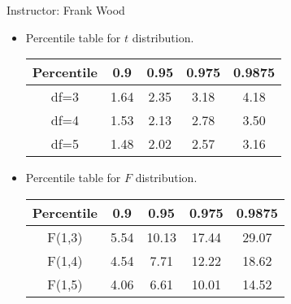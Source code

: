 \documentclass[12pt]{article}
\begin{document}

 \begin{center}
  Instructor: Frank Wood 
 \end{center}
\studentinfo
{}
\finishfirstpage

\begin{itemize}
  \item Percentile table for $t$ distribution.
\begin{center}

\begin{tabular}{c|cccc}
  \toprule
Percentile&0.9&0.95&0.975&0.9875\\
\midrule
df=3 & 1.64 & 2.35 & 3.18 & 4.18 \\
  df=4& 1.53 & 2.13 & 2.78 & 3.50 \\
  df=5 & 1.48 & 2.02 & 2.57 & 3.16 \\
\bottomrule
\end{tabular}
\end{center}
 \item Percentile table for $F$ distribution.
\begin{center}

\begin{tabular}{c|cccc}
\toprule
Percentile&0.9&0.95&0.975&0.9875\\
\midrule
F(1,3)& 5.54 & 10.13 & 17.44 & 29.07 \\
F(1,4)&4.54 & 7.71 & 12.22 & 18.62 \\
F(1,5)&4.06 & 6.61 & 10.01 & 14.52 \\
\bottomrule
\end{tabular}
\end{center}
\end{itemize}
\end{document}
